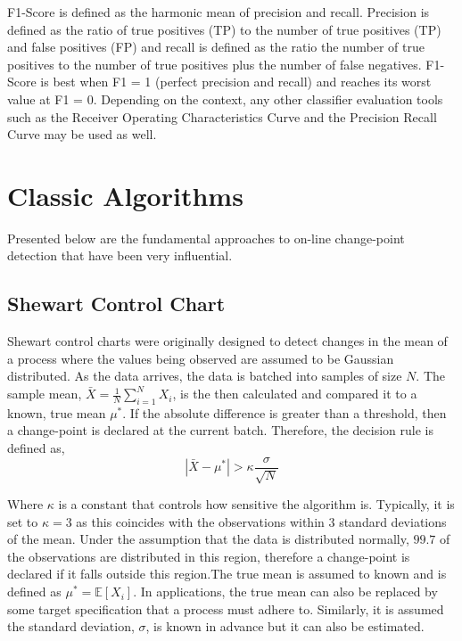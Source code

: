  F1-Score is defined as the harmonic mean of precision and recall. Precision is defined as the ratio of true positives (TP) to the
number of true positives (TP) and false positives (FP) and recall is defined as the ratio the number of true positives to the
number of true positives plus the number of false negatives. F1-Score is best when F1 = 1 (perfect precision and recall) and reaches its worst value at F1 = 0. Depending on the context, any other classifier evaluation tools such as the Receiver Operating Characteristics Curve and the Precision Recall Curve may be used as well.

\section{Classic Algorithms}
Presented below are the fundamental approaches to on-line change-point detection that have been very influential. 

\subsection{Shewart Control Chart}
Shewart control charts were originally designed to detect changes in the mean of a process where the values being observed are assumed to be Gaussian distributed. As the data arrives, the data is batched into samples of size $N$.  The sample mean, $\bar{X}=\frac{1}{N} \sum_{i=1}^N X_i$, is the then calculated and compared it to a known, true mean $\mu^*$. If the absolute difference is greater than a threshold, then a change-point is declared at the current batch. Therefore, the decision rule is defined as,
\begin{equation}
|\bar{X}-\mu^*| > \kappa \frac{\sigma}{\sqrt{N}}
\end{equation}

Where $\kappa$ is a constant that controls how sensitive the algorithm is. Typically, it is set to $\kappa=3$ as this coincides with the observations within $3$ standard deviations of the mean.  Under the assumption that the data is distributed normally, $99.7$ of the observations are distributed in this region, therefore a change-point is declared if it falls outside this region.The true mean is assumed to known and is defined as $\mu^* = \mathbb{E}[X_i]$. In applications, the true mean can also be replaced by some target specification that a process must adhere to. Similarly, it is assumed the standard deviation, $\sigma$, is known in advance but it can also be estimated.

